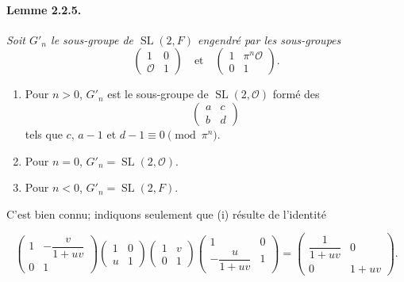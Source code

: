\documentclass[10pt,a4paper]{article}
\providecommand{\SL}{\operatorname{SL}}
\providecommand{\OO}{\mathcal O}
\begin{document}
\paragraph{Lemme 2.2.5.}{\itshape  Soit \(G'_n\) le sous-groupe de \(\SL(2,F)\) engendré par les sous-groupes
\[
\begin{pmatrix}1&0\\ \OO&1\end{pmatrix}
\quad\text{et}\quad
\begin{pmatrix}1&\pi^n\OO\\0&1\end{pmatrix}.
\]
\begin{enumerate}[label=(\roman*)]
\item Pour \(n>0\), \(G'_n\) est le sous-groupe de \(\SL(2,\OO)\) formé des
\[
\begin{pmatrix}a&c\\b&d\end{pmatrix}
\]
tels que \(c\), \(a-1\) et \(d-1\equiv0\pmod{\pi^n}\).
\item Pour \(n=0\), \(G'_n=\SL(2,\OO)\).
\item Pour \(n<0\), \(G'_n=\SL(2,F)\).
\end{enumerate}
\par}
C'est bien connu; indiquons seulement que (i) résulte de l'identité

\clearpage
{}
\hypertarget{authority-27}{}
\[
\begin{pmatrix}1&-\dfrac{v}{1+uv}\\0&1\end{pmatrix}
\begin{pmatrix}1&0\\u&1\end{pmatrix}
\begin{pmatrix}1&v\\0&1\end{pmatrix}
\begin{pmatrix}1&0\\-\dfrac{u}{1+uv}&1\end{pmatrix}
=
\begin{pmatrix}\dfrac1{1+uv}&0\\0&1+uv\end{pmatrix}.
\]
\end{document}
